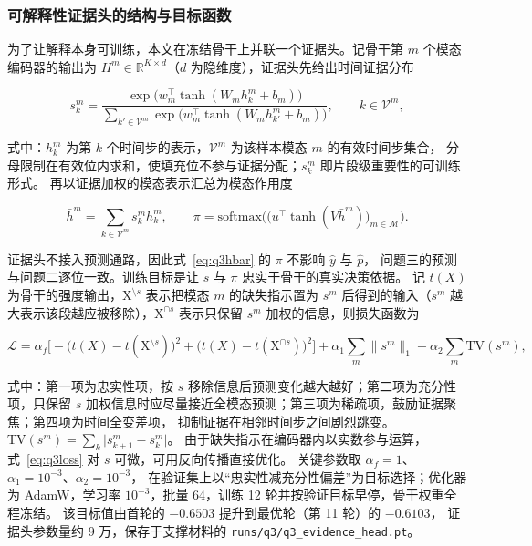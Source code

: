 \documentclass[withoutpreface,bwprint]{cumcmthesis}
\begin{document}
\subsubsection{可解释性证据头的结构与目标函数}

为了让解释本身可训练，本文在冻结骨干上并联一个证据头。记骨干第 $m$ 个模态编码器的输出为
$H^{m}\in\mathbb{R}^{K\times d}$（$d$ 为隐维度），证据头先给出时间证据分布

\begin{equation}
\label{eq:q3s}
s^{m}_{k}=\frac{\exp\!\big(w_{m}^{\top}\tanh(W_{m}h^{m}_{k}+b_{m})\big)}
{\sum_{k'\in\mathcal{V}^{m}}\exp\!\big(w_{m}^{\top}\tanh(W_{m}h^{m}_{k'}+b_{m})\big)},
\qquad k\in\mathcal{V}^{m},
\end{equation}

式中：$h^{m}_{k}$ 为第 $k$ 个时间步的表示，$\mathcal{V}^{m}$ 为该样本模态 $m$ 的有效时间步集合，
分母限制在有效位内求和，使填充位不参与证据分配；$s^{m}_{k}$ 即片段级重要性的可训练形式。
再以证据加权的模态表示汇总为模态作用度

\begin{equation}
\label{eq:q3hbar}
\bar h^{m}=\sum_{k\in\mathcal{V}^{m}}s^{m}_{k}h^{m}_{k},\qquad
\pi=\mathrm{softmax}\Big(\big(u^{\top}\tanh(V\bar h^{m})\big)_{m\in\mathcal{M}}\Big).
\end{equation}

证据头不接入预测通路，因此式~\eqref{eq:q3hbar} 的 $\pi$ 不影响 $\hat y$ 与 $\hat p$，
问题三的预测与问题二逐位一致。训练目标是让 $s$ 与 $\pi$ 忠实于骨干的真实决策依据。
记 $t(X)$ 为骨干的强度输出，$\mathrm{X}^{\setminus s}$ 表示把模态 $m$ 的缺失指示置为 $s^{m}$
后得到的输入（$s^{m}$ 越大表示该段越应被移除），$\mathrm{X}^{\cap s}$ 表示只保留 $s^{m}$
加权的信息，则损失函数为

\begin{equation}
\label{eq:q3loss}
\mathcal{L}=\alpha_{f}\Big[-\big(t(X)-t(\mathrm{X}^{\setminus s})\big)^{2}
+\big(t(X)-t(\mathrm{X}^{\cap s})\big)^{2}\Big]
+\alpha_{1}\sum_{m}\lVert s^{m}\rVert_{1}
+\alpha_{2}\sum_{m}\mathrm{TV}(s^{m}),
\end{equation}

式中：第一项为忠实性项，按 $s$ 移除信息后预测变化越大越好；第二项为充分性项，只保留
$s$ 加权信息时应尽量接近全模态预测；第三项为稀疏项，鼓励证据聚焦；第四项为时间全变差项，
抑制证据在相邻时间步之间剧烈跳变。$\mathrm{TV}(s^{m})=\sum_{k}\lvert s^{m}_{k+1}-s^{m}_{k}\rvert$。
由于缺失指示在编码器内以实数参与运算，式~\eqref{eq:q3loss} 对 $s$ 可微，可用反向传播直接优化。
关键参数取 $\alpha_{f}=1$、$\alpha_{1}=10^{-3}$、$\alpha_{2}=10^{-3}$，
在验证集上以“忠实性减充分性偏差”为目标选择；优化器为 AdamW，学习率
$10^{-3}$，批量 64，训练 12 轮并按验证目标早停，骨干权重全程冻结。
该目标值由首轮的 $-0.6503$ 提升到最优轮（第 11 轮）的 $-0.6103$，
证据头参数量约 9 万，保存于支撑材料的 \texttt{runs/q3/q3\_evidence\_head.pt}。
\end{document}
